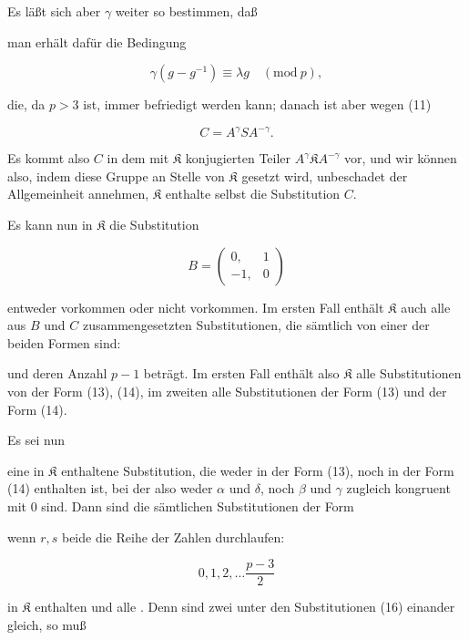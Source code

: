 
Es läßt sich aber $\gamma$ weiter so bestimmen, daß


man erhält dafür die Bedingung

\[ \gamma(g-g^{-1})\equiv\lambda g\quad(\mathrm{mod}\ p), \]

die, da $p>3$ ist, immer befriedigt werden kann; danach ist aber wegen (11)

\[ C=A^{\gamma}SA^{-\gamma}. \]

Es kommt also $C$ in dem mit $\mathfrak{K}$ konjugierten Teiler $A^{\gamma}\mathfrak{K} A^{-\gamma}$ vor, und wir können also, indem diese Gruppe an Stelle von $\mathfrak{K}$ gesetzt wird, unbeschadet der Allgemeinheit annehmen, $\mathfrak{K}$ enthalte selbst die Substitution $C$.

Es kann nun in $\mathfrak{K}$ die Substitution

\[ B=\begin{pmatrix}0, & 1\\ -1, & 0\end{pmatrix} \]

entweder vorkommen oder nicht vorkommen. Im ersten Fall enthält $\mathfrak{K}$ auch alle aus $B$ und $C$ zusammengesetzten Substitutionen, die sämtlich von einer der beiden Formen sind:



und deren Anzahl $p-1$ beträgt. Im ersten Fall enthält also $\mathfrak{K}$ alle Substitutionen von der Form (13), (14), im zweiten alle Substitutionen der Form (13) und  der Form (14).

Es sei nun


eine in $\mathfrak{K}$ enthaltene Substitution, die weder in der Form (13), noch in der Form (14) enthalten ist, bei der also weder $\alpha$ und $\delta$, noch $\beta$ und $\gamma$ zugleich kongruent mit $0$ sind. Dann sind die sämtlichen Substitutionen der Form


wenn $r,s$ beide die Reihe der Zahlen durchlaufen:

\[ 0,1,2,\dots\frac{p-3}{2} \]

in $\mathfrak{K}$ enthalten und alle . Denn sind zwei unter den Substitutionen (16) einander gleich, so muß
